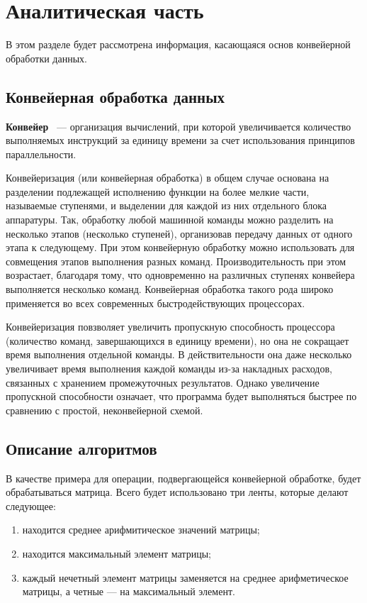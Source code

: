 \chapter{Аналитическая часть}
В этом разделе будет рассмотрена информация, касающаяся основ конвейерной обработки данных.

\section{Конвейерная обработка данных}
\textbf{Конвейер}~\cite{conway}  --- организация вычислений, при которой увеличивается количество выполняемых инструкций за единицу времени за счет использования принципов параллельности.

Конвейеризация (или конвейерная обработка) в общем случае основана на разделении подлежащей исполнению функции на более мелкие части, называемые ступенями, и выделении для каждой из них отдельного блока аппаратуры. 
Так, обработку любой машинной команды можно разделить на несколько этапов (несколько ступеней), организовав передачу данных от одного этапа к следующему. 
При этом конвейерную обработку можно использовать для совмещения этапов выполнения разных команд. 
Производительность при этом возрастает, благодаря тому, что одновременно на различных ступенях конвейера выполняется несколько команд. 
Конвейерная обработка такого рода широко применяется во всех современных быстродействующих процессорах.


Конвейеризация повзволяет увеличить пропускную способность процессора (количество команд, завершающихся в единицу времени), но она не сокращает время выполнения отдельной команды. 
В действительности она даже несколько увеличивает время выполнения каждой команды из-за накладных расходов, связанных с хранением промежуточных результатов. 
Однако увеличение пропускной способности означает, что программа будет выполняться быстрее по сравнению с простой, неконвейерной схемой.


\section{Описание алгоритмов}

В качестве примера для операции, подвергающейся конвейерной обработке, будет обрабатываться матрица. 
Всего будет использовано три ленты, которые делают следующее:

\begin{enumerate}[label=\arabic*)]
	\item находится среднее арифмитическое значений матрицы;
	\item находится максимальный элемент матрицы;
	\item каждый нечетный элемент матрицы заменяется на среднее арифметическое матрицы, а четные --- на максимальный элемент.
\end{enumerate}



